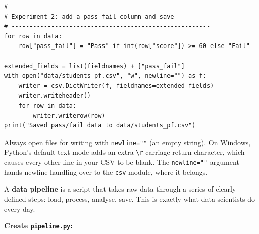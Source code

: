 \documentclass{cslab}
\begin{document}
\begin{lstlisting}
# -------------------------------------------------------
# Experiment 2: add a pass_fail column and save
# -------------------------------------------------------
for row in data:
    row["pass_fail"] = "Pass" if int(row["score"]) >= 60 else "Fail"

extended_fields = list(fieldnames) + ["pass_fail"]
with open("data/students_pf.csv", "w", newline="") as f:
    writer = csv.DictWriter(f, fieldnames=extended_fields)
    writer.writeheader()
    for row in data:
        writer.writerow(row)
print("Saved pass/fail data to data/students_pf.csv")
\end{lstlisting}

\begin{warning}
Always open files for writing with \texttt{newline=""} (an empty string). On Windows, Python's default text mode adds an extra \texttt{\textbackslash r} carriage-return character, which causes every other line in your CSV to be blank. The \texttt{newline=""} argument hands newline handling over to the \texttt{csv} module, where it belongs.
\end{warning}


A \textbf{data pipeline} is a script that takes raw data through a series of clearly defined steps: load, process, analyse, save. This is exactly what data scientists do every day.

\textbf{Create \texttt{pipeline.py}:}
\end{document}
